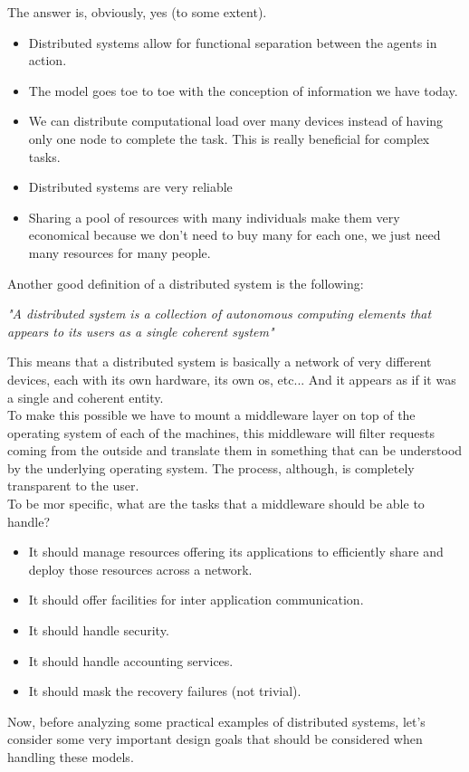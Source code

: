 The answer is, obviously, yes (to some extent). 
\begin{itemize}
    \item Distributed systems allow for functional separation between the agents in action.
    \item The model goes toe to toe with the conception of information we have today.
    \item We can distribute computational load over many devices instead of having only one node to complete the task. This is really beneficial for complex tasks.
    \item Distributed systems are very reliable
    \item Sharing a pool of resources with many individuals make them very economical because we don't need to buy many for each one, we just need many resources for many people.
\end{itemize}
Another good definition of a distributed system is the following:
\begin{center}
    \textit{"A distributed system is a collection of autonomous computing elements that appears to its users as a single coherent system"}
\end{center}
This means that a distributed system is basically a network of very different devices, each with its own hardware, its own os, etc... And it appears as if it was a single and coherent entity. \\
To make this possible we have to mount a middleware layer on top of the operating system of each of the machines, this middleware will filter requests coming from the outside and translate them in something that can be understood by the underlying operating system. The process, although, is completely transparent to the user. \\
To be mor specific, what are the tasks that a middleware should be able to handle?
\begin{itemize}
    \item It should manage resources offering its applications to efficiently share and deploy those resources across a network.
    \item It should offer facilities for inter application communication.
    \item It should handle security.
    \item It should handle accounting services.
    \item It should mask the recovery failures (not trivial).
\end{itemize}
Now, before analyzing some practical examples of distributed systems, let's consider some very important design goals that should be considered when handling these models.
